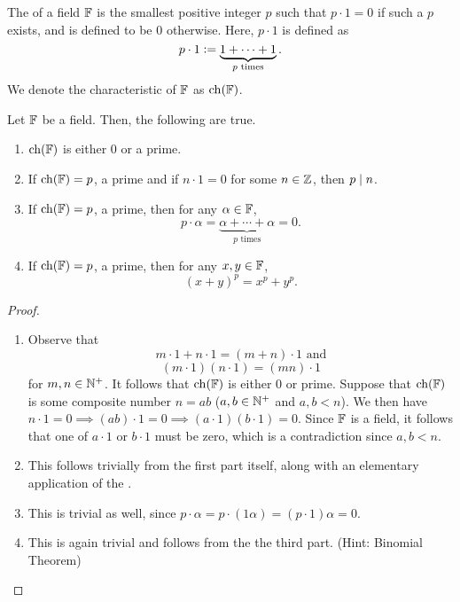 \begin{defn}
    The  of a field $\mathbb{F}$ is the smallest positive integer $p$ such that $p \cdot 1 = 0$ if such a $p$ exists, and is defined to be $0$ otherwise. Here, $p \cdot 1$ is defined as
    \[
        p\cdot1 \vcentcolon= \underbrace{1 + \cdots + 1}_{p\text{ times}}.
    \]We denote the characteristic of $\mathbb{F}$ as $\operatorname{ch}(\mathbb{F})$.
\end{defn}
\begin{prop} \label{prop:char-basics}
    Let $\mathbb{F}$ be a field. Then, the following are true.
    \begin{enumerate}
        \item $\operatorname{ch}(\mathbb{F})$ is either $0$ or a prime.
        \item If $\operatorname{ch}(\mathbb{F}) = p$, a prime and if $n \cdot 1 = 0$ for some $n \in \mathbb{Z}$\footnotemark, then $p \mid n$.
        \item If $\operatorname{ch}(\mathbb{F}) = p$, a prime, then for any $\alpha \in \mathbb{F}$,
        \[  
            p \cdot \alpha = \underbrace{\alpha + \cdots + \alpha}_{p\text{ times}} = 0.
        \]
        \item If $\operatorname{ch}(\mathbb{F}) = p$, a prime, then for any $x,y \in \mathbb{F}$, 
        \[
            (x+y)^p = x^p + y^p.
        \]
    \end{enumerate}
\end{prop}
\begin{proof}
\phantom{hi}
\begin{enumerate}
    \item Observe that 
    \[
        m \cdot 1 + n \cdot 1 = (m + n) \cdot 1 \text{ and}
    \]
    \[
        (m \cdot 1)(n \cdot 1) = (mn) \cdot 1
    \]
    for $m,n \in \mathbb{N}^+$. It follows that $\operatorname{ch}(\mathbb{F})$ is either $0$ or prime. Suppose that $\operatorname{ch}(\mathbb{F})$ is some composite number $n=ab$ ($a,b \in \mathbb{N}^+$ and $a,b < n$). We then have $n \cdot 1 = 0 \implies (ab) \cdot 1 = 0 \implies (a \cdot 1)(b \cdot 1) = 0$. Since $\mathbb{F}$ is a field, it follows that one of $a\cdot 1$ or $b\cdot 1$ must be zero, which is a contradiction since $a,b < n$.
    
    \item This follows trivially from the first part itself, along with an elementary application of the .
    
    \item This is trivial as well, since $p \cdot \alpha = p \cdot (1\alpha) = (p\cdot 1)\alpha = 0$. 
    
    \item This is again trivial and follows from the the third part. (Hint: Binomial Theorem)
\end{enumerate}
\end{proof}

